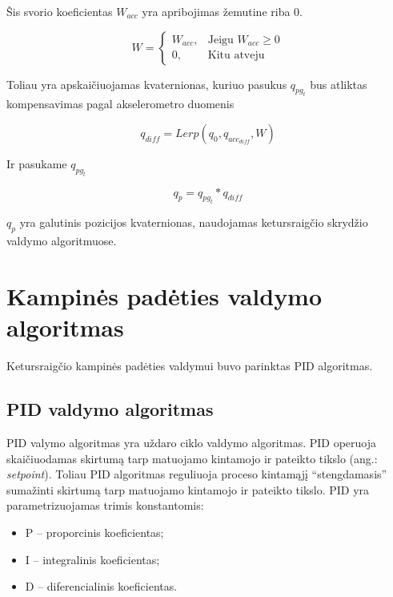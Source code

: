 \documentclass[12pt, a4paper, lithuanian, final]{article}
\begin{document}
Šis svorio koeficientas $W_{acc}$ yra apribojimas žemutine riba 0.

\begin{equation}
	W = \begin{cases}
		W_{acc}, & \text{Jeigu } W_{acc} \geq 0\\
		0, & \text{Kitu atveju}
	\end{cases}
\end{equation}


Toliau yra apskaičiuojamas kvaternionas, kuriuo pasukus $q_{pg_t}$ bus atliktas kompensavimas pagal akselerometro duomenis

\begin{equation}
	q_{diff} = Lerp(q_{0}, q_{acc_{diff}}, W)
\end{equation}

Ir pasukame $q_{pg_t}$

\begin{equation}
	q_{p} = q_{pg_t} * q_{diff}
\end{equation}

$q_{p}$ yra galutinis pozicijos kvaternionas, naudojamas ketursraigčio skrydžio valdymo algoritmuose.





\section{Kampinės padėties valdymo algoritmas}
\label{skyr-attitudeCtrl}

Ketursraigčio kampinės padėties valdymui buvo parinktas PID algoritmas.

\subsection{PID valdymo algoritmas}

PID valymo algoritmas yra uždaro ciklo valdymo algoritmas.
PID operuoja skaičiuodamas skirtumą tarp matuojamo kintamojo ir pateikto tikslo (ang.: \textit{setpoint}).
Toliau PID algoritmas reguliuoja proceso kintamąjį "`stengdamasis"' sumažinti skirtumą tarp matuojamo kintamojo ir pateikto tikslo.
PID yra parametrizuojamas trimis konstantomis:

\begin{itemize}
	\item P -- proporcinis koeficientas;
	\item I -- integralinis koeficientas;
	\item D -- diferencialinis koeficientas.
\end{itemize}
\end{document}
